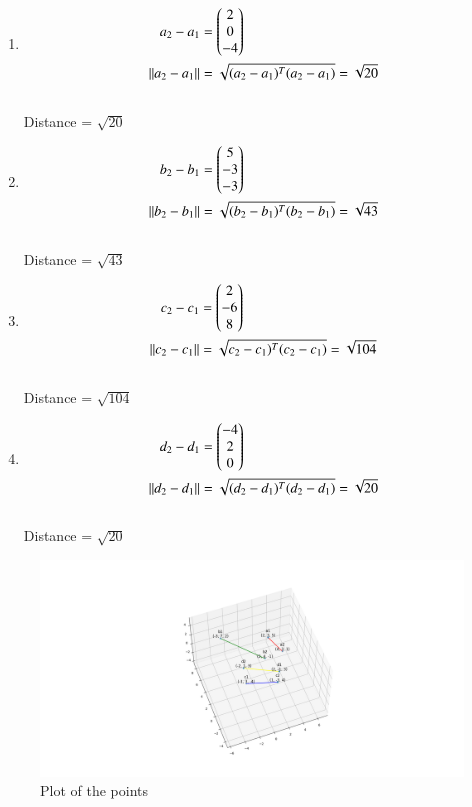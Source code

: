 \documentclass[journal]{IEEEtran}
\begin{document}
\begin{enumerate}
\item 
\begin{align}
	a_2-a_1 &= \begin{pmatrix}
		2\\
		0\\
		-4\\
	\end{pmatrix}\\
	\left\lVert a_2-a_1\right\rVert &= \sqrt{(a_2-a_1)^T (a_2-a_1)} = \sqrt{20}
\end{align}\\
Distance = $\sqrt{20}$
\item 
\begin{align}
	b_2-b_1 &= \begin{pmatrix}
		5\\
		-3\\
		-3\\
	\end{pmatrix}\\
	\left\lVert b_2-b_1\right\rVert &= \sqrt{(b_2-b_1)^T (b_2-b_1)} = \sqrt{43}
\end{align}\\
Distance = $\sqrt{43}$

\item 
\begin{align}
	c_2-c_1 &= \begin{pmatrix}
		2\\
		-6\\
		8\\
	\end{pmatrix}\\
	\left\lVert c_2-c_1\right\rVert &= \sqrt{c_2-c_1)^T (c_2-c_1)} = \sqrt{104}
\end{align}\\
Distance = $\sqrt{104}$
\item 
\begin{align}
	d_2-d_1 &= \begin{pmatrix}
		-4\\
		2\\
		0\\
	\end{pmatrix}\\
	\left\lVert d_2-d_1\right\rVert &= \sqrt{(d_2-d_1)^T (d_2-d_1)} = \sqrt{20}
\end{align}\\
Distance = $\sqrt{20}$
\end{enumerate}
\begin{figure}[h!]
   \centering
   \includegraphics[width=0.7\linewidth]{figs/Figure_1.png}
   \caption{Plot of the points}
   \label{stemplot}
\end{figure}
\end{document}

